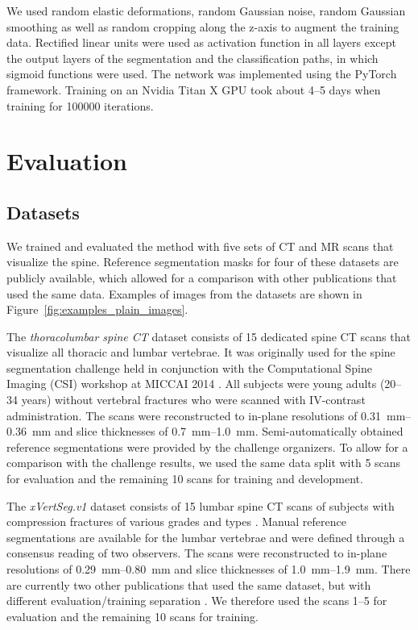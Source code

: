 \documentclass[authoryear,5p,final,times]{elsarticle}
\begin{document}
    We used random elastic deformations, random Gaussian noise, random Gaussian smoothing as well as random cropping along the z-axis to augment the training data. Rectified linear units were used as activation function in all layers except the output layers of the segmentation and the classification paths, in which sigmoid functions were used. The network was implemented using the PyTorch framework. Training on an Nvidia Titan X GPU took about 4--5 days when training for \num{100000} iterations.
        
    \section{Evaluation}
    
    \subsection{Datasets}
    
    We trained and evaluated the method with five sets of CT and MR scans that visualize the spine. Reference segmentation masks for four of these datasets are publicly available, which allowed for a comparison with other publications that used the same data. Examples of images from the datasets are shown in Figure~\ref*{fig:examples_plain_images}.
    
    The \emph{thoracolumbar spine CT} dataset consists of 15 dedicated spine CT scans that visualize all thoracic and lumbar vertebrae. It was originally used for the spine segmentation challenge held in conjunction with the Computational Spine Imaging (CSI) workshop at MICCAI 2014 \citep{Yao2016}. All subjects were young adults (\numrange{20}{34} years) without vertebral fractures who were scanned with IV-contrast administration. The scans were reconstructed to in-plane resolutions of \SIrange{0.31}{0.36}{\milli\meter} and slice thicknesses of \SIrange{0.7}{1.0}{\milli\meter}. Semi-automatically obtained reference segmentations were provided by the challenge organizers. To allow for a comparison with the challenge results, we used the same data split with 5 scans for evaluation and the remaining 10 scans for training and development.
        
    The \emph{xVertSeg.v1} dataset consists of 15 lumbar spine CT scans of subjects with compression fractures of various grades and types \citep{Ibragimov2017}. Manual reference segmentations are available for the lumbar vertebrae and were defined through a consensus reading of two observers. The scans were reconstructed to in-plane resolutions of \SIrange{0.29}{0.80}{\milli\meter} and slice thicknesses of \SIrange{1.0}{1.9}{\milli\meter}. There are currently two other publications that used the same dataset, but with different evaluation/training separation \citep{Janssens2018,Sekuboyina2017}. We therefore used the scans \numrange{1}{5} for evaluation and the remaining 10 scans for training.
    
\end{document}
